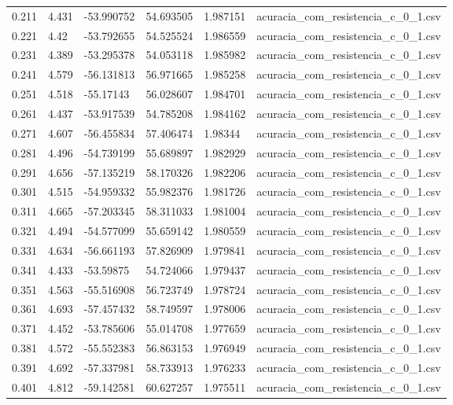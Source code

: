 \begin{table}
\begin{tabular}{llllll}
0.211 & 4.431 & -53.990752 & 54.693505 & 1.987151 & acuracia\_com\_resistencia\_c\_0\_1.csv \\
0.221 & 4.42 & -53.792655 & 54.525524 & 1.986559 & acuracia\_com\_resistencia\_c\_0\_1.csv \\
0.231 & 4.389 & -53.295378 & 54.053118 & 1.985982 & acuracia\_com\_resistencia\_c\_0\_1.csv \\
0.241 & 4.579 & -56.131813 & 56.971665 & 1.985258 & acuracia\_com\_resistencia\_c\_0\_1.csv \\
0.251 & 4.518 & -55.17143 & 56.028607 & 1.984701 & acuracia\_com\_resistencia\_c\_0\_1.csv \\
0.261 & 4.437 & -53.917539 & 54.785208 & 1.984162 & acuracia\_com\_resistencia\_c\_0\_1.csv \\
0.271 & 4.607 & -56.455834 & 57.406474 & 1.98344 & acuracia\_com\_resistencia\_c\_0\_1.csv \\
0.281 & 4.496 & -54.739199 & 55.689897 & 1.982929 & acuracia\_com\_resistencia\_c\_0\_1.csv \\
0.291 & 4.656 & -57.135219 & 58.170326 & 1.982206 & acuracia\_com\_resistencia\_c\_0\_1.csv \\
0.301 & 4.515 & -54.959332 & 55.982376 & 1.981726 & acuracia\_com\_resistencia\_c\_0\_1.csv \\
0.311 & 4.665 & -57.203345 & 58.311033 & 1.981004 & acuracia\_com\_resistencia\_c\_0\_1.csv \\
0.321 & 4.494 & -54.577099 & 55.659142 & 1.980559 & acuracia\_com\_resistencia\_c\_0\_1.csv \\
0.331 & 4.634 & -56.661193 & 57.826909 & 1.979841 & acuracia\_com\_resistencia\_c\_0\_1.csv \\
0.341 & 4.433 & -53.59875 & 54.724066 & 1.979437 & acuracia\_com\_resistencia\_c\_0\_1.csv \\
0.351 & 4.563 & -55.516908 & 56.723749 & 1.978724 & acuracia\_com\_resistencia\_c\_0\_1.csv \\
0.361 & 4.693 & -57.457432 & 58.749597 & 1.978006 & acuracia\_com\_resistencia\_c\_0\_1.csv \\
0.371 & 4.452 & -53.785606 & 55.014708 & 1.977659 & acuracia\_com\_resistencia\_c\_0\_1.csv \\
0.381 & 4.572 & -55.552383 & 56.863153 & 1.976949 & acuracia\_com\_resistencia\_c\_0\_1.csv \\
0.391 & 4.692 & -57.337981 & 58.733913 & 1.976233 & acuracia\_com\_resistencia\_c\_0\_1.csv \\
0.401 & 4.812 & -59.142581 & 60.627257 & 1.975511 & acuracia\_com\_resistencia\_c\_0\_1.csv \\

\end{tabular}
\end{table}
